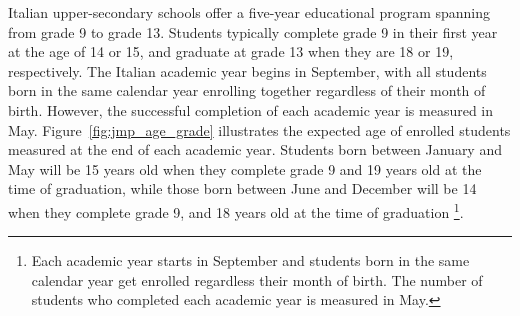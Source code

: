 \documentclass[12pt]{article}
\theoremstyle{plain}
\theoremstyle{plain}
\theoremstyle{plain}
\theoremstyle{definition}
\theoremstyle{plain}
\theoremstyle{definition}
\theoremstyle{plain}
\theoremstyle{remark}
\theoremstyle{definition}
\theoremstyle{definition}
\theoremstyle{plain}
\begin{document}
\begin{table}[H]
\caption{Types of high school tracks in the Italian educational system.}
\label{tab:jmp_hs_tracks}
\vspace{0.2cm}
\centering
{}
\end{table}
\vspace{0.5cm}


Italian upper-secondary schools offer a five-year educational program spanning from grade 9 to grade 13. Students typically complete grade 9 in their first year at the age of 14 or 15, and graduate at grade 13 when they are 18 or 19, respectively. The Italian academic year begins in September, with all students born in the same calendar year enrolling together regardless of their month of birth. However, the successful completion of each academic year is measured in May. Figure~\ref{fig:jmp_age_grade} illustrates the expected age of enrolled students measured at the end of each academic year. Students born between January and May will be 15 years old when they complete grade 9 and 19 years old at the time of graduation, while those born between June and December will be 14 when they complete grade 9, and 18 years old at the time of graduation \footnote{Each academic year starts in September and students born in the same calendar year get enrolled regardless their month of birth. The number of students who completed each academic year is measured in May.}.
\vspace{0.3cm}
\end{document}
